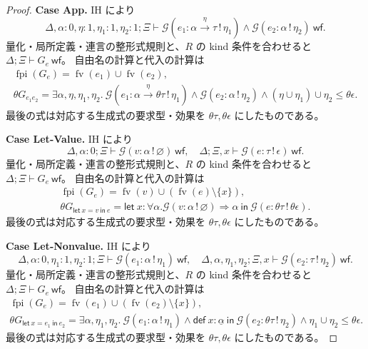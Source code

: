 \documentclass[a4paper,11pt]{article}
\theoremstyle{definition}
\newenvironment{Case}[1]{\par\smallskip\noindent\textbf{Case #1.}\enspace\ignorespaces}{\par}
\newcommand{\FV}{\operatorname{fv}}
\newcommand{\FPI}{\operatorname{fpi}}
\newcommand{\emp}{\varnothing}
\newcommand{\arr}[3]{#1\xrightarrow{#2}#3}
\newcommand{\gen}[3]{\mathcal G(#1:#2\,!\,#3)}
\newcommand{\Def}[3]{\mathsf{def}\ #1:#2\ \mathsf{in}\ #3}
\newcommand{\Let}[3]{\mathsf{let}\ #1:#2\ \mathsf{in}\ #3}
\newcommand{\lete}[3]{\mathsf{let}\ #1=#2\ \mathsf{in}\ #3}
\newcommand{\mono}[1]{\underline{#1}}
\begin{document}
\begin{proof}
\begin{Case}{App}
IH により
\[\Delta,\alpha:0,\eta:1,\eta_1:1,\eta_2:1;\Xi\vdash\gen{e_1}{\arr\alpha\eta\tau}{\eta_1}\land\gen{e_2}\alpha{\eta_2}\ \mathsf{wf}.\]
量化・局所定義・連言の整形式規則と、$R$ の kind 条件を合わせると $\Delta;\Xi\vdash G_e\ \mathsf{wf}$。
自由名の計算と代入の計算は
\begin{gather*}
 \FPI(G_e)=\FV(e_1)\cup\FV(e_2),\\
 \theta G_{e_1e_2}=\exists\alpha,\eta,\eta_1,\eta_2.\ \gen{e_1}{\arr\alpha\eta{\theta\tau}}{\eta_1}\land\gen{e_2}\alpha{\eta_2}\land(\eta\cup\eta_1)\cup\eta_2\leq\theta\epsilon.
\end{gather*}
最後の式は対応する生成式の要求型・効果を $\theta\tau,\theta\epsilon$ にしたものである。
\end{Case}

\begin{Case}{Let-Value}
IH により
\[\Delta,\alpha:0;\Xi\vdash\gen v\alpha\emp\ \mathsf{wf},\quad\Delta;\Xi,x\vdash\gen e\tau\epsilon\ \mathsf{wf}.\]
量化・局所定義・連言の整形式規則と、$R$ の kind 条件を合わせると $\Delta;\Xi\vdash G_e\ \mathsf{wf}$。
自由名の計算と代入の計算は
\begin{gather*}
 \FPI(G_e)=\FV(v)\cup(\FV(e)\setminus\{x\}),\\
 \theta G_{\lete x v e}=\Let x{\forall\alpha.\gen v\alpha\emp\Rightarrow\alpha}{\gen e{\theta\tau}{\theta\epsilon}}.
\end{gather*}
最後の式は対応する生成式の要求型・効果を $\theta\tau,\theta\epsilon$ にしたものである。
\end{Case}

\begin{Case}{Let-Nonvalue}
IH により
\[\Delta,\alpha:0,\eta_1:1,\eta_2:1;\Xi\vdash\gen{e_1}\alpha{\eta_1}\ \mathsf{wf},\quad\Delta,\alpha,\eta_1,\eta_2;\Xi,x\vdash\gen{e_2}\tau{\eta_2}\ \mathsf{wf}.\]
量化・局所定義・連言の整形式規則と、$R$ の kind 条件を合わせると $\Delta;\Xi\vdash G_e\ \mathsf{wf}$。
自由名の計算と代入の計算は
\begin{gather*}
 \FPI(G_e)=\FV(e_1)\cup(\FV(e_2)\setminus\{x\}),\\
 \theta G_{\lete x{e_1}{e_2}}=\exists\alpha,\eta_1,\eta_2.\ \gen{e_1}\alpha{\eta_1}\land\Def x{\mono\alpha}{\gen{e_2}{\theta\tau}{\eta_2}}\land\eta_1\cup\eta_2\leq\theta\epsilon.
\end{gather*}
最後の式は対応する生成式の要求型・効果を $\theta\tau,\theta\epsilon$ にしたものである。
\end{Case}


\end{proof}
\end{document}
